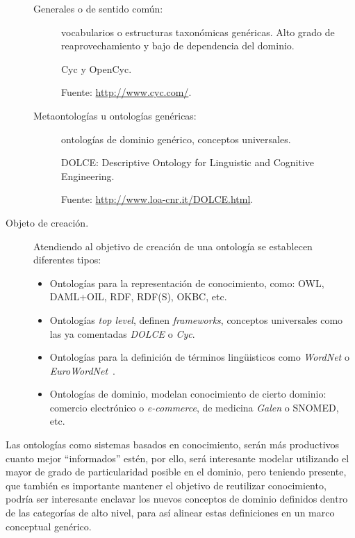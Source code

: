 \begin{description}
\begin{description}
\item[Generales o de sentido común:] vocabularios o estructuras taxonómicas
genéricas. Alto grado de reaprovechamiento y bajo de dependencia del dominio.

\begin{example}
Cyc y OpenCyc.


Fuente: \url{http://www.cyc.com/}. 
\end{example}

\item[Metaontologías u ontologías genéricas:] ontologías de dominio genérico,
conceptos universales.
\begin{example}
DOLCE: Descriptive Ontology for Linguistic and Cognitive Engineering.


Fuente: \url{http://www.loa-cnr.it/DOLCE.html}. 
\end{example}

\end{description}

\item [Objeto de creación.]

Atendiendo al objetivo de creación de una ontología se establecen diferentes tipos:

\begin{itemize}
  \item Ontologías para la representación de conocimiento, como: \gls{OWL},
  \gls{DAML+OIL}, \gls{RDF}, RDF(S), OKBC, etc.
  \item Ontologías \textit{top level}, definen \textit{frameworks}, conceptos
  universales como las ya comentadas \textit{DOLCE} o \textit{Cyc}. 
  \item Ontologías para la definición de términos lingüisticos como
  \textit{WordNet} o \textit{EuroWordNet}~\cite{EuroWordNet}. 

	\item Ontologías de dominio, modelan conocimiento de cierto dominio: comercio
	electrónico o \textit{e-commerce}, de medicina \textit{Galen} o SNOMED, etc. 
\end{itemize}

\end{description}

Las ontologías como sistemas basados en conocimiento, serán más productivos
cuanto mejor ``informados'' estén, por ello, será interesante modelar utilizando
el mayor de grado de particularidad posible en el dominio, pero teniendo presente, que también es
importante mantener el objetivo de reutilizar conocimiento, podría ser interesante
enclavar los nuevos conceptos de dominio definidos dentro de las categorías de
alto nivel, para así alinear estas definiciones en un marco conceptual genérico.


